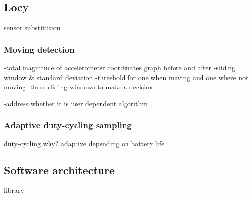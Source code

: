 \subsection{Locy}
\label{s:design:locy}

sensor substitution

\subsubsection{Moving detection}
\label{s:design:locy:moving}
-total magnitude of accelerometer coordinates		graph before and after
-sliding window \& standard deviation
	-threshold			for one when moving and one where not moving
-three sliding windows to make a decision

-address whether it is user dependent algorithm

\subsubsection{Adaptive duty-cycling sampling}
\label{s:design:locy:adaptive}
duty-cycling
		why?
adaptive depending on battery life

\subsection{Software architecture}
\label{s:design:locy:adaptive}
library

